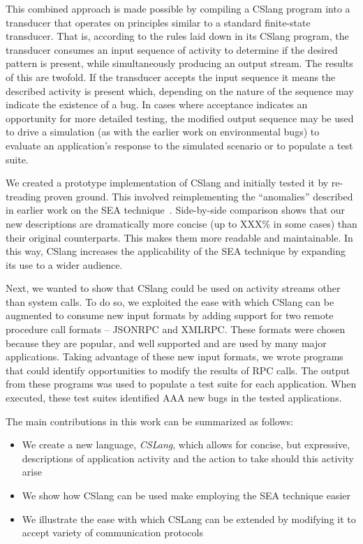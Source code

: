 This combined approach is made possible
by compiling a CSlang program
into a transducer
that operates on principles similar
to a standard finite-state transducer.
That is,
according to the rules laid down in its CSlang program,
the transducer consumes an input sequence of activity
to determine if the desired pattern is present,
while simultaneously producing an output stream.
The results of this are twofold.
If the transducer accepts the input sequence
it means the described activity is present which,
depending on the nature of the sequence
may indicate the existence of a bug.
In cases where acceptance indicates an opportunity
for more detailed testing,
the modified output sequence may be used
to drive a simulation (as with the earlier work on environmental bugs)
to evaluate an application's response to the simulated scenario
or to populate a test suite.

We created a prototype implementation of CSlang
and initially tested it by
re-treading proven ground.
This involved reimplementing the ``anomalies''
described in earlier work on the SEA technique~\cite{crashsim}.
Side-by-side comparison shows that our new
descriptions are dramatically more concise (up to XXX\% in some cases)
than their original counterparts.
This makes them
more readable
and maintainable.
In this way, CSlang increases the applicability of the SEA technique
by expanding its use to a wider audience.

Next, we wanted to
show that CSlang
could be used on activity streams
other than system calls.
To do so,
we exploited the ease with which
CSlang can be augmented
to consume new input formats
by adding support for two remote procedure call formats -- JSONRPC and XMLRPC.
These formats were chosen
because they are popular,
and well supported and are
used by many major applications.
Taking advantage of these new input formats,
we wrote programs
that could identify opportunities
to modify the results of RPC calls.
The output from these programs was used to populate a test suite
for each application.
When executed, these test suites identified AAA new bugs in the tested applications.

The main contributions in this work can be summarized as follows:

\begin{itemize}

\item{We create a new language, {\em CSLang},
  which allows for concise, but expressive, descriptions of
    application activity and the action to take should this activity arise}

\item{We show how CSlang can be used make employing the SEA technique easier}

\item{We illustrate the ease with which CSLang can be extended by modifying
  it to accept variety of communication protocols}

\end{itemize}

